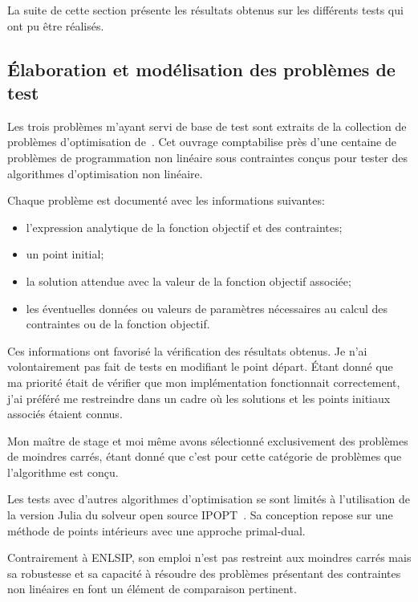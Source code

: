 La suite de cette section présente les résultats obtenus sur les différents tests qui ont pu être réalisés.

\subsection{\'Elaboration et modélisation des problèmes de test}

Les trois problèmes m'ayant servi de base de test sont extraits de la collection de problèmes d'optimisation de~\citet{hockschi}. Cet ouvrage comptabilise près 
d'une centaine de problèmes de programmation non linéaire sous contraintes con\c cus pour tester des algorithmes d'optimisation non linéaire. 

Chaque problème est documenté avec les informations suivantes:

\begin{itemize}
    \item l'expression analytique de la fonction objectif et des contraintes;
    \item un point initial;
    \item la solution attendue avec la valeur de la fonction objectif associée;
    \item les éventuelles données ou valeurs de paramètres nécessaires au calcul des contraintes ou de la fonction objectif.
\end{itemize}

Ces informations ont favorisé la vérification des résultats obtenus. Je n'ai volontairement pas fait de tests en modifiant le point départ. \'Etant donné que ma priorité 
était de vérifier que mon implémentation fonctionnait correctement, j'ai préféré me restreindre dans un cadre où les solutions et les points initiaux associés étaient connus.

Mon maître de stage et moi même avons sélectionné exclusivement des problèmes de moindres carrés, étant donné que c'est pour cette catégorie de problèmes que l'algorithme est
con\c cu. 

Les tests avec d'autres algorithmes d'optimisation se sont limités à l'utilisation de la version Julia du solveur open source IPOPT~\cite{andreas02}. Sa conception 
repose sur une méthode de points intérieurs avec une approche primal-dual.

Contrairement à ENLSIP, son emploi n'est pas restreint aux moindres carrés mais sa robustesse et sa capacité à résoudre des problèmes présentant des contraintes non linéaires 
en font un élément de comparaison pertinent. 



